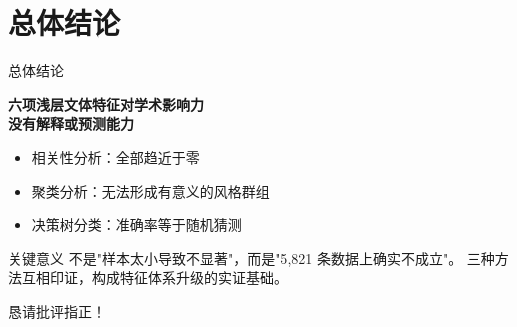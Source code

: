 \documentclass[10pt,aspectratio=169]{ctexbeamer}
\begin{document}
\section{总体结论}

\begin{frame}{总体结论}
  \begin{center}
    \Large \textbf{六项浅层文体特征对学术影响力\\没有解释或预测能力}
  \end{center}

  \vspace{0.8em}
  \begin{itemize}
    \item 相关性分析：全部趋近于零
    \item 聚类分析：无法形成有意义的风格群组
    \item 决策树分类：准确率等于随机猜测
  \end{itemize}

  \vspace{0.8em}
  \begin{block}{关键意义}
    不是"样本太小导致不显著"，而是"5{,}821 条数据上确实不成立"。
    三种方法互相印证，构成特征体系升级的实证基础。
  \end{block}
\end{frame}

\begin{frame}{}
  \centering
  \Large 恳请批评指正！
\end{frame}
\end{document}
